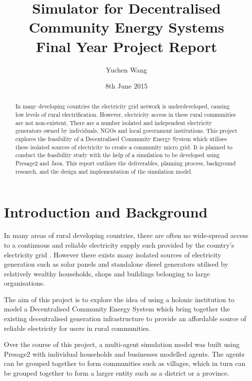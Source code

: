 \documentclass{article}
\title{Simulator for Decentralised Community Energy Systems \\ Final Year Project Report}
\author{Yuchen Wang}
\date{8th June 2015}
\begin{document}
\maketitle  %

\clearpage  %
\begin{abstract}
In many developing countries the electricity grid network is underdeveloped, causing low levels of rural electrification. However, electricity access in these rural communities are not non-existent. There are a number isolated and independent electricity generators owned by individuals, NGOs and local government institutions. This project explores the feasibility of a Decentralised Community Energy System which utilises these isolated sources of electricity to create a community micro grid. It is planned to conduct the feasibility study with the help of a simulation to be developed using Presage2 and Java. This report outlines the deliverables, planning process, background research, and the design and implementation of the simulation model. 

\end{abstract}
\clearpage

\tableofcontents
\clearpage

\section{Introduction and Background}
In many areas of rural developing countries, there are often no wide-spread access to a continuous and reliable electricity supply such provided by the country's electricity grid \cite{IEA-web:2015}. However there exists many isolated sources of electricity generation such as solar panels and standalone diesel generators utilised by relatively wealthy households, shops and buildings belonging to large organisations. 

The aim of this project is to explore the idea of using a holonic institution to model a Decentralised Community Energy System which bring together the existing decentralised generation infrastructure to provide an affordable source of reliable electricity for users in rural communities. 

Over the course of this project, a multi-agent simulation model was built using Presage2 with individual households and businesses modelled agents. The agents can be grouped together to form communities such as villages, which in turn can be grouped together to form a larger entity such as a district or a province. 
\end{document}
